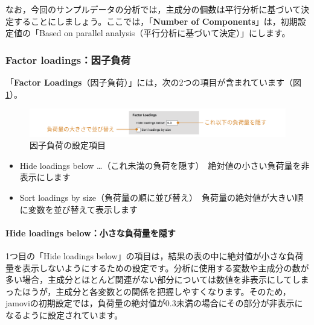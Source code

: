 \documentclass[
  12pt,
  a5jpaper,
  lualatex, ja=standard]{bxjsbook}
\providecommand{\tightlist}{%
  \setlength{\itemsep}{0pt}\setlength{\parskip}{0pt}}
\newenvironment{jmvsettings}{%
	\begin{center}%
	\begin{tcolorbox}[%
		title=設定項目,
		colframe=gmoji,
		colbacktitle=gmoji,
		colback=gmoji!2!white,
		breakable,
		width=.9\textwidth,
		]\small\addtolength{\leftmargini}{-3\labelsep}%
	}%
	{\end{tcolorbox}\end{center}}
\begin{document}
なお，今回のサンプルデータの分析では，主成分の個数は平行分析に基づいて決定することにしましょう。ここでは，「\textbf{Number of Components}」は，初期設定値の「Based on parallel analysis（平行分析に基づいて決定）」にします。

\hypertarget{subsub:factor-pca-loadings}{%
\subsubsection*{Factor loadings：因子負荷}\label{subsub:factor-pca-loadings}}

「\textbf{Factor Loadings}（因子負荷）」には，次の2つの項目が含まれています（図\ref{fig:factor-pca-loadings}）。

\begin{figure}[!ht]

{\centering \includegraphics[width=1\linewidth]{images/factor/pca-loadings} 

}

\caption{因子負荷の設定項目}\label{fig:factor-pca-loadings}
\end{figure}

\begin{jmvsettings}

\begin{itemize}
\tightlist
\item
  Hide loadings below \ldots（これ未満の負荷を隠す）　絶対値の小さい負荷量を非表示にします
\item
  Sort loadings by size（負荷量の順に並び替え）　負荷量の絶対値が大きい順に変数を並び替えて表示します
\end{itemize}

\end{jmvsettings}

\hypertarget{hide-loadings-belowux5c0fux3055ux306aux8ca0ux8377ux91cfux3092ux96a0ux3059}{%
\paragraph*{Hide loadings below：小さな負荷量を隠す}\label{hide-loadings-belowux5c0fux3055ux306aux8ca0ux8377ux91cfux3092ux96a0ux3059}}

1つ目の「Hide loadings below」の項目は，結果の表の中に絶対値が小さな負荷量を表示しないようにするための設定です。分析に使用する変数や主成分の数が多い場合，主成分とほとんど関連がない部分については数値を非表示にしてしまったほうが，主成分と各変数との関係を把握しやすくなります。そのため，jamoviの初期設定では，負荷量の絶対値が0.3未満の場合にその部分が非表示になるように設定されています。
\end{document}
